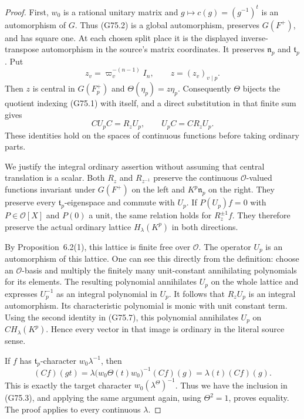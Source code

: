 \begin{proof}
First, \(w_0\) is a rational unitary matrix and
\(g\mapsto c(g)=(g^{-1})^t\) is an automorphism of \(G\).
Thus (G75.2) is a global automorphism, preserves \(G(F^+)\), and has square
one.  At each chosen split place it is the displayed inverse-transpose
automorphism in the source's matrix coordinates.
It preserves \(\mathfrak n_p\) and \(\mathfrak t_p\).
Put
\[
 z_v=\varpi_v^{-(n-1)}I_n,\qquad z=(z_v)_{v\mid p}.
\]
Then \(z\) is central in \(G(F_p^+)\) and
\(\Theta(\eta_p)=z\eta_p\).
Consequently \(\Theta\) bijects the quotient indexing (G75.1) with itself,
and a direct substitution in that finite sum gives
\[
        C U_p C=R_zU_p,\qquad U_pC=C R_zU_p.
 \tag{G75.7}
\]
These identities hold on the spaces of continuous functions before
taking ordinary parts.

We justify the integral ordinary assertion without assuming that
central translation is a scalar.  Both \(R_z\) and \(R_{z^{-1}}\)
preserve the continuous \(\mathcal O\)-valued functions invariant under
\(G(F^+)\) on the left and \(K^p\mathfrak n_p\) on the right.
They preserve every \(\mathfrak t_p\)-eigenspace and commute with \(U_p\).
If \(P(U_p)f=0\) with \(P\in\mathcal O[X]\) and \(P(0)\) a unit, the
same relation holds for \(R_z^{\pm1}f\).
They therefore preserve the actual ordinary lattice
\(H_\lambda(K^p)\) in both directions.

By Proposition~6.2(1), this lattice is finite free over \(\mathcal O\).
The operator \(U_p\) is an automorphism of this lattice.
One can see this directly from the definition: choose an
\(\mathcal O\)-basis and multiply the finitely many unit-constant
annihilating polynomials for its elements.  The resulting polynomial
annihilates \(U_p\) on the whole lattice and expresses \(U_p^{-1}\) as an
integral polynomial in \(U_p\).
It follows that \(R_zU_p\) is an integral automorphism.
Its characteristic polynomial is monic with unit constant term.
Using the second identity in (G75.7), this polynomial annihilates
\(U_p\) on \(C H_\lambda(K^p)\).
Hence every vector in that image is ordinary in the literal source
sense.

If \(f\) has \(\mathfrak t_p\)-character \(w_0\lambda^{-1}\), then
\[
 (Cf)(gt)
  =\lambda\bigl(w_0\Theta(t)w_0\bigr)^{-1}(Cf)(g)
  =\lambda(t)(Cf)(g).
\]
This is exactly the target character
\(w_0(\lambda^\Theta)^{-1}\).
Thus we have the inclusion in (G75.3), and applying the same argument
again, using \(\Theta^2=1\), proves equality.
The proof applies to every continuous \(\lambda\).


\end{proof}
